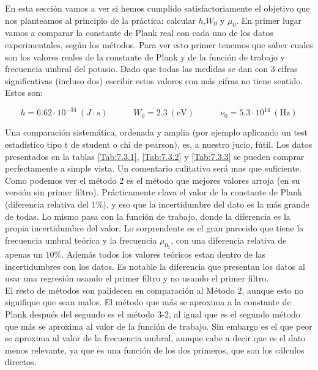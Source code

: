 \documentclass[12pt,a4paper]{article}
\numberwithin{equation}{section}
\numberwithin{table}{section}
\numberwithin{figure}{section}
\newcommand{\tquad}{\quad \quad \quad}
\begin{document}
En esta sección vamos a ver si hemos cumplido satisfactoriamente el objetivo que nos planteamos al principio de la práctica: calcular $h$,$W_0$ y $\mu_0$. En primer lugar vamos a comparar la constante de Plank real con cada uno de los datos experimentales, según los métodos. Para ver esto primer tenemos que saber cuales son los valores reales de la constante de Plank y de la función de trabajo y frecuencia umbral del potasio. Dado que todas las medidas se dan con 3 cifras significativas (incluso dos) escribir estos valores con más cifras no tiene sentido. Estos son:

\begin{equation}
h = 6.62 \cdot 10^{-34} \ (J\cdot s) \tquad W_0 = 2.3 \ (\mathrm{eV}) \tquad \nu_0 = 5.3 \cdot 10^{14} \ (\mathrm{Hz})
\end{equation}

Una comparación sistemática, ordenada y amplia (por ejemplo aplicando un test estadístico tipo t de student o chi de pearson), es, a nuestro jucio, fútil. Los datos presentados en la tablas \ref{Tab:7.3.1}, \ref{Tab:7.3.2} y \ref{Tab:7.3.3} se pueden comprar perfectamente a simple vista. Un comentario culitativo será mas que suficiente. \\

Como podemos ver el método 2 es el método que mejores valores arroja (en su versión sin primer filtro). Prácticamente clava el valor de la constante de Plank (diferencia relativa del $1\%$), y eso que la incertidumbre del dato es la más grande de todas. Lo mismo pasa con la función de trabajo, donde la diferencia es la propia incertidumbre del valor. Lo sorprendente es el gran parecido que tiene la frecuencia umbral teórica y la frecuencia $\mu_{0_2}$, con una diferencia relativa de apenas un $10\%$. Además todos los valores teóricos estan dentro de las incertidumbres con los datos. Es notable la diferencia que presentan los datos al usar una regresión usando el primer filtro y no usando el primer filtro. \\

El resto de métodos son palidecen en comparación al Método 2, aunque esto no signifique que sean malos. El método que más se aproxima a la constante de Plank después del segundo es el método 3-2, al igual que es el segundo método que más se aproxima al valor de la función de trabajo. Sin embargo es el que peor se aproxima al valor de la frecuencia umbral, aunque cabe a decir que es el dato menos relevante, ya que es una función de los dos primeros, que son los cálculos directos.   \\
\end{document}
